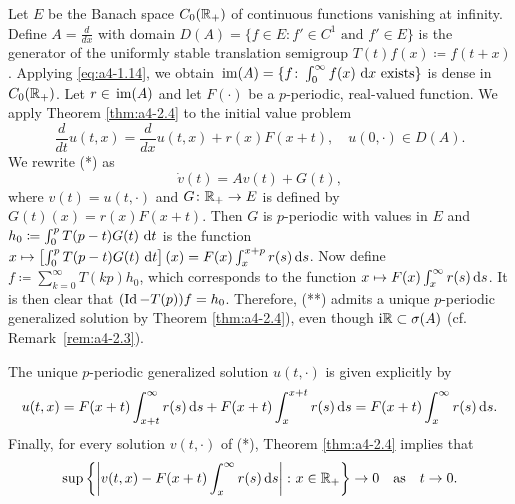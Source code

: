 \begin{example}\label{ex:a4-2.5}
Let $E$ be the Banach space $C_{0}(\mathbb{R}_{+})$ of continuous functions vanishing at infinity.
Define  $A = \frac{d}{dx}$ with domain $D(A) = \{f \in E: f' \in C^{1} \text{ and } f' \in E\}$ is the generator of the uniformly stable translation semigroup $T(t)f(x) \coloneqq f(t+x)$. 
Applying \eqref{eq:a4-1.14}, we obtain $\mathop{}\mathrm{im}(A) = \{f\colon\int_{0}^{\infty} f(x) \,\mathop{}\!\mathrm{d}{x} \text{ exists}\}$ is dense in $C_{0}(\mathbb{R}_{+})$. 
Let $r \in \mathop{}\mathrm{im}(A)$ and let $F(\cdot)$ be a $p$-periodic, real-valued function.
We apply Theorem \ref{thm:a4-2.4}  to the initial value problem
\begin{equation}
 \frac{d}{dt} u(t,x) = \frac{d}{dx}u(t,x) + r(x)F(x+t), \quad u(0,\cdot) \in D(A). 
 \tag{*}
\end{equation}
We rewrite (*) as  
\begin{equation}
\dot{v}(t) = Av(t) + G(t), \tag{**}
\end{equation}
where $v(t) = u(t,\cdot)$ and $G\colon\mathbb{R}_{+} \to E$ is defined by $G(t)(x) = r(x)F(x+t)$.
Then $G$ is $p$-periodic with values in $E$ and $h_{0} \coloneqq \int_{0}^{p} T(p-t)G(t) \,\mathop{}\!\mathrm{d}{t}$ is the function $x \mapsto \left[\int_{0}^{p} T(p-t)G(t) \,\mathop{}\!\mathrm{d}{t}\right](x) = F(x)\int_{x}^{x+p} r(s)  \mathop{}\!\mathrm{d}{s}$. 
Now define $f \coloneqq  \sum_{k=0}^{\infty} T(kp)h_{0}$, which corresponds to the function $x \mapsto F(x)\int_{x}^{\infty} r(s)  \mathop{}\!\mathrm{d}{s}$. It is then clear that $(\operatorname{Id} - T(p))f = h_{0}$. 
Therefore, (**) admits a unique $p$-periodic generalized solution by Theorem \ref{thm:a4-2.4}), even though $\mathrm{i} \mathbb{R} \subset \sigma(A)$ (cf. Remark~\ref{rem:a4-2.3}).

The unique $p$-periodic generalized solution $u(t,\cdot)$ is given explicitly by 
\[
u(t,x) = F(x+t)\int_{x+t}^{\infty} r(s) \mathop{}\!\mathrm{d}{s} + F(x+t)\int_{x}^{x+t} r(s) \mathop{}\!\mathrm{d}{s} = F(x+t)\int_{x}^{\infty} r(s) \mathop{}\!\mathrm{d}{s}.
\]
Finally, for every solution $v(t,\cdot)$ of (*), Theorem \ref{thm:a4-2.4} implies that
\[
\sup\left\{\left|v(t,x) - F(x+t)\int_{x}^{\infty} r(s)  \mathop{}\!\mathrm{d}{s}\right| \colon x \in \mathbb{R}_{+}\right\} \to 0 \quad \text{as} \quad t \to 0.
\]
\end{example}
